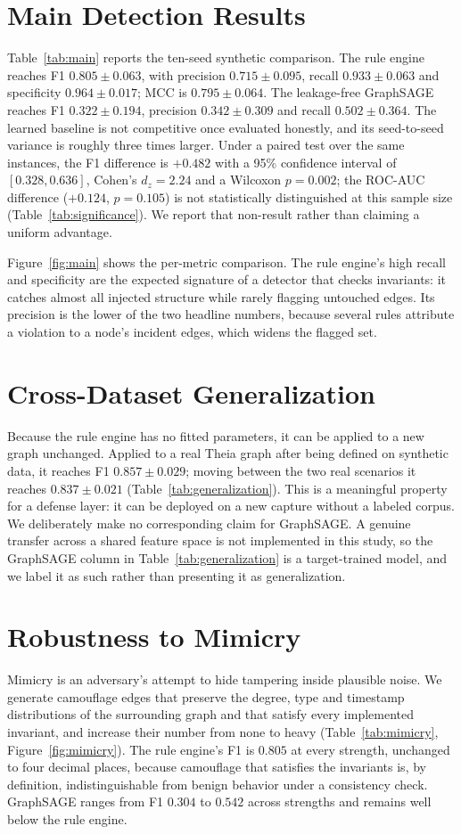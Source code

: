 \documentclass[journal]{IEEEtran}
\begin{document}
\section{Main Detection Results}
\label{sec:main}
Table~\ref{tab:main} reports the ten-seed synthetic comparison. The rule engine
reaches F1 $0.805\pm0.063$, with precision $0.715\pm0.095$, recall
$0.933\pm0.063$ and specificity $0.964\pm0.017$; MCC is $0.795\pm0.064$. The
leakage-free GraphSAGE reaches F1 $0.322\pm0.194$, precision $0.342\pm0.309$ and
recall $0.502\pm0.364$. The learned baseline is not competitive once evaluated
honestly, and its seed-to-seed variance is roughly three times larger. Under a
paired test over the same instances, the F1 difference is $+0.482$ with a 95\%
confidence interval of $[0.328, 0.636]$, Cohen's $d_z=2.24$ and a Wilcoxon
$p=0.002$; the ROC-AUC difference ($+0.124$, $p=0.105$) is not statistically
distinguished at this sample size (Table~\ref{tab:significance}). We report that
non-result rather than claiming a uniform advantage.

Figure~\ref{fig:main} shows the per-metric comparison. The rule engine's high
recall and specificity are the expected signature of a detector that checks
invariants: it catches almost all injected structure while rarely flagging
untouched edges. Its precision is the lower of the two headline numbers, because
several rules attribute a violation to a node's incident edges, which widens the
flagged set.

\section{Cross-Dataset Generalization}
\label{sec:generalization}
Because the rule engine has no fitted parameters, it can be applied to a new
graph unchanged. Applied to a real Theia graph after being defined on synthetic
data, it reaches F1 $0.857\pm0.029$; moving between the two real scenarios it
reaches $0.837\pm0.021$ (Table~\ref{tab:generalization}). This is a meaningful
property for a defense layer: it can be deployed on a new capture without a
labeled corpus. We deliberately make no corresponding claim for GraphSAGE. A
genuine transfer across a shared feature space is not implemented in this study,
so the GraphSAGE column in Table~\ref{tab:generalization} is a target-trained
model, and we label it as such rather than presenting it as generalization.

\section{Robustness to Mimicry}
\label{sec:robust}
Mimicry is an adversary's attempt to hide tampering inside plausible noise. We
generate camouflage edges that preserve the degree, type and timestamp
distributions of the surrounding graph and that satisfy every implemented
invariant, and increase their number from none to heavy (Table~\ref{tab:mimicry},
Figure~\ref{fig:mimicry}). The rule engine's F1 is $0.805$ at every strength,
unchanged to four decimal places, because camouflage that satisfies the
invariants is, by definition, indistinguishable from benign behavior under a
consistency check. GraphSAGE ranges from F1 $0.304$ to $0.542$ across strengths
and remains well below the rule engine.
\end{document}
